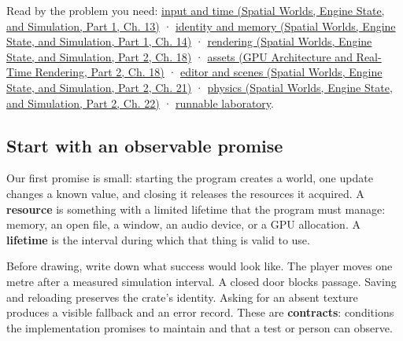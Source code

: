 Read by the problem you need: \href{../05-Spatial-Worlds-Engine-State-and-Simulation-P01/main.pdf\#nameddest=05-engine-i-ch013-let-one-input-produce-one-intended-change}{input and time (Spatial Worlds, Engine State, and Simulation, Part 1, Ch. 13)} · \href{../05-Spatial-Worlds-Engine-State-and-Simulation-P01/main.pdf\#nameddest=05-engine-i-ch014-keep-identity-storage-and-ownership-in-agreement}{identity and memory (Spatial Worlds, Engine State, and Simulation, Part 1, Ch. 14)} · \href{../05-Spatial-Worlds-Engine-State-and-Simulation-P02/main.pdf\#nameddest=05-engine-i-ch018-give-the-renderer-a-clear-job-then-meet-the-graphics-api}{rendering (Spatial Worlds, Engine State, and Simulation, Part 2, Ch. 18)} · \href{../06-GPU-Architecture-and-Real-Time-Rendering-P02/main.pdf\#nameddest=06-engine-ii-ch027-prepare-and-publish-content-before-promising-it-is-ready}{assets (GPU Architecture and Real-Time Rendering, Part 2, Ch. 18)} · \href{../05-Spatial-Worlds-Engine-State-and-Simulation-P02/main.pdf\#nameddest=06-engine-ii-ch031-make-a-world-that-can-be-authored-saved-and-run}{editor and scenes (Spatial Worlds, Engine State, and Simulation, Part 2, Ch. 21)} · \href{../05-Spatial-Worlds-Engine-State-and-Simulation-P02/main.pdf\#nameddest=06-engine-ii-ch033-let-motion-and-contact-answer-the-same-world-rules}{physics (Spatial Worlds, Engine State, and Simulation, Part 2, Ch. 22)} · \hyperref[06-engine-ii-ch042-reconstruct-the-working-loop-and-test-its-contracts]{runnable laboratory}.

\subsection{Start with an observable promise}\label{05-engine-i-ch001-start-with-an-observable-promise}

\hypertarget{05-engine-i-ch001-start-with-an-observable-promise}{}

Our first promise is small: starting the program creates a world, one update changes a known value, and closing it releases the resources it acquired. A \textbf{resource} is something with a limited lifetime that the program must manage: memory, an open file, a window, an audio device, or a GPU allocation. A \textbf{lifetime} is the interval during which that thing is valid to use.

Before drawing, write down what success would look like. The player moves one metre after a measured simulation interval. A closed door blocks passage. Saving and reloading preserves the crate's identity. Asking for an absent texture produces a visible fallback and an error record. These are \textbf{contracts}: conditions the implementation promises to maintain and that a test or person can observe.

